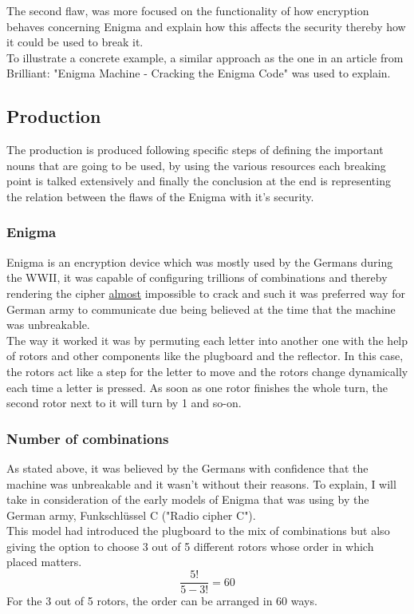 \documentclass[conference,compsoc]{IEEEtran}
\begin{document}
The second flaw, was more focused on the functionality of how encryption behaves concerning Enigma and explain how this affects the security thereby how it could be used to break it.\\
To illustrate a concrete example, a similar approach as the one in an article from Brilliant: "Enigma Machine - Cracking the Enigma Code" was used to explain.\\

\subsection{Production}

The production is produced following specific steps of defining the important nouns that are going to be used, by using the various resources each breaking point is talked extensively and finally the conclusion at the end is representing the relation between the flaws of the Enigma with it's security.\\  

\subsubsection{Enigma} Enigma is an encryption device which was mostly used by the Germans during the WWII, it was capable of configuring trillions of combinations and thereby rendering the cipher \underline{almost} impossible to crack and such it was preferred way for German army to communicate due being believed at the time that the machine was unbreakable.\\
The way it worked it was by permuting each letter into another one with the help of rotors and other components like the plugboard and the reflector. In this case, the rotors act like a step for the letter to move and the rotors change dynamically each time a letter is pressed. As soon as one rotor finishes the whole turn, the second rotor next to it will turn by 1 and so-on.\\

\subsubsection{Number of combinations}
As stated above, it was believed by the Germans with confidence that the machine was unbreakable and it wasn't without their reasons. To explain, I will take in consideration of the early models of Enigma that was using by the German army, Funkschlüssel C ("Radio cipher C").\\
This model had introduced the plugboard to the mix of combinations but also giving the option to choose 3 out of 5 different rotors whose order in which placed matters.\\
\begin{equation}
    \frac{5!}{5-3!}=60
\end{equation}
For the 3 out of 5 rotors, the order can be arranged in 60 ways.\\
\end{document}
